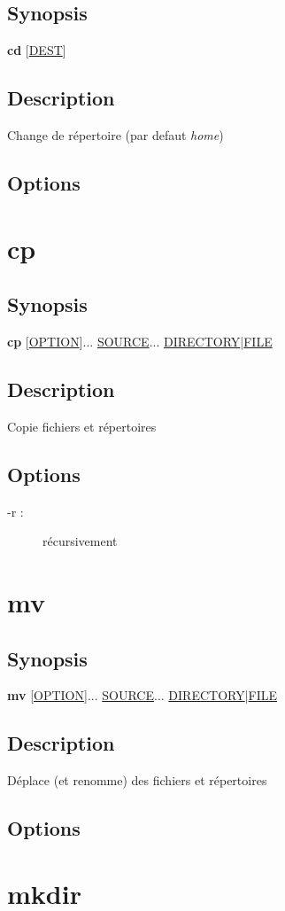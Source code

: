\documentclass[a4paper, 10pt, onecolumn, openright, oneside]{book}
\begin{document}
			\subsection{Synopsis}
				\textbf{cd} [\ul{DEST}]
			\subsection{Description}
				Change de répertoire (par defaut \emph{home})
			\subsection{Options}
		\section{cp}
			\subsection{Synopsis}
				\textbf{cp} [\ul{OPTION}]... \ul{SOURCE}... \ul{DIRECTORY}|\ul{FILE}
			\subsection{Description}
				Copie fichiers et répertoires
			\subsection{Options}
				\begin{description}
				\item[-r :] récursivement
				\end{description}
		\section{mv}
			\subsection{Synopsis}
				\textbf{mv} [\ul{OPTION}]... \ul{SOURCE}... \ul{DIRECTORY}|\ul{FILE}
			\subsection{Description}
				Déplace (et renomme) des fichiers et répertoires
			\subsection{Options}
		\section{mkdir}
\end{document}
